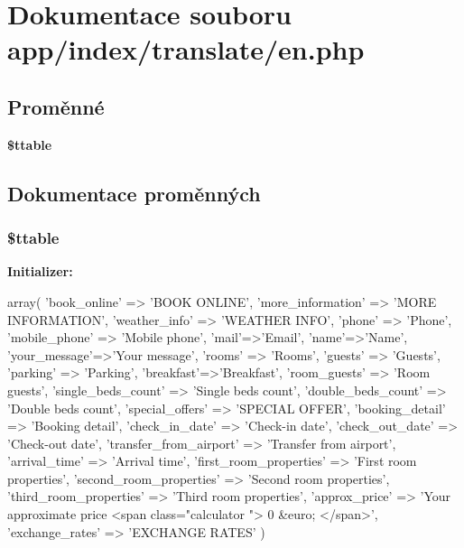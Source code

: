 \section{Dokumentace souboru app/index/translate/en.php}
\label{db/d4f/en_8php}
\subsection*{Proměnné}
\begin{DoxyCompactItemize}
\item 
{\bf \$ttable}
\end{DoxyCompactItemize}


\subsection{Dokumentace proměnných}
\subsubsection[{\$ttable}]{\setlength{\rightskip}{0pt plus 5cm}\$ttable}\label{db/d4f/en_8php_a35a6a273f392214c0227565567464b17}
{\bfseries Initializer:}
\begin{DoxyCode}
 array(
                'book_online' => 'BOOK ONLINE',
                'more_information' => 'MORE INFORMATION',
                'weather_info' => 'WEATHER INFO',
                'phone' => 'Phone',
                'mobile_phone' => 'Mobile phone',
                'mail'=>'Email',
                'name'=>'Name',
                'your_message'=>'Your message',
                'rooms' => 'Rooms',
                'guests' => 'Guests',
                'parking' => 'Parking',
                'breakfast'=>'Breakfast',
                'room_guests' => 'Room guests',
                'single_beds_count' => 'Single beds count',
                'double_beds_count' => 'Double beds count',
                'special_offers' => 'SPECIAL OFFER',
                'booking_detail' => 'Booking detail',
                'check_in_date' => 'Check-in date',
                'check_out_date' => 'Check-out date',
                'transfer_from_airport' => 'Transfer from airport',
                'arrival_time' => 'Arrival time',
                'first_room_properties' => 'First room properties',
                'second_room_properties' => 'Second room properties',
                'third_room_properties' => 'Third room properties',
                'approx_price' => 'Your approximate price <span class="calculator
      "> 0 &euro; </span>',
                'exchange_rates' => 'EXCHANGE RATES'
        )
\end{DoxyCode}
